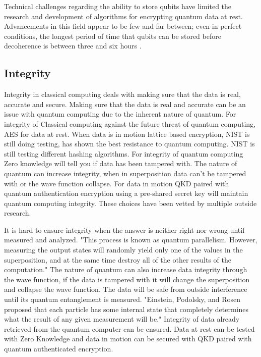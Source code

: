 \documentclass[sigconf]{acmart}
\begin{document}
Technical challenges regarding the ability to store qubits have limited the research and development of algorithms for encrypting quantum data at rest. Advancements in this field appear to be few and far between; even in perfect conditions, the longest period of time that qubits can be stored before decoherence is between three and six hours \cite{saeedi_room-temperature_2013, zhong_optically_2015}.

\subsection{Integrity}
Integrity in classical computing deals with making sure that the data is real, accurate and secure. Making sure that the data is real and accurate can be an issue with quantum computing due to the inherent nature of quantum. For integrity of Classical computing against the future threat of quantum computing, AES for data at rest. When data is in motion lattice based encryption, NIST is still doing testing, has shown the best resistance to quantum computing. NIST is still testing different hashing algorithms. For integrity of quantum computing Zero knowledge will tell you if data has been tampered with. The nature of quantum can increase integrity, when in superposition data can't be tampered with or the wave function collapse. For data in motion QKD paired with quantum authentication encryption using a pre-shared secret key will maintain quantum computing integrity. These choices have been vetted by multiple outside research.   

It is hard to ensure integrity when the answer is neither right nor wrong until measured and analyzed. "This process is known as quantum parallelism. However, measuring the output states will randomly yield only one of the values in the superposition, and at the same time destroy all of the other results of the computation."\cite{rieffel_introduction_1998} The nature of quantum can also increase data integrity through the wave function, if the data is tampered with it will change the superposition and collapse the wave function. The data will be safe from outside interference until its quantum entanglement is measured. "Einstein, Podolsky, and Rosen proposed that each particle has some internal state that completely determines what the result of any given measurement will be."\cite{rieffel_introduction_1998} Integrity of data already retrieved from the quantum computer can be ensured. Data at rest can be tested with Zero Knowledge and data in motion can be secured with QKD paired with quantum authenticated encryption. 
\end{document}
